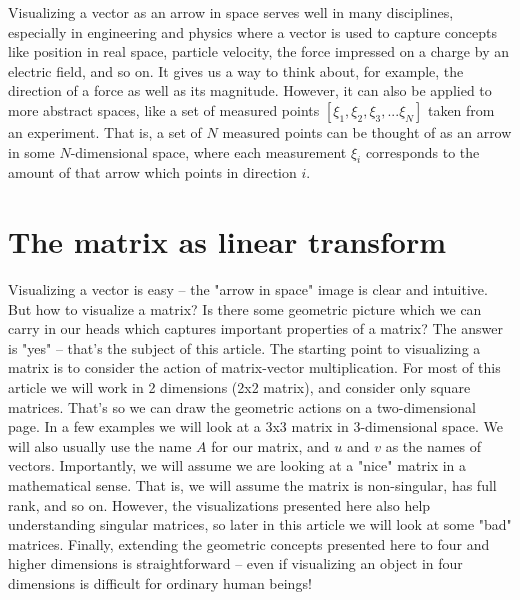 \documentclass[onefignum,onetabnum]{siamart190516}
\begin{document}
Visualizing a vector as an arrow in space  
serves well in many disciplines, especially 
in engineering and physics where a vector is used to capture concepts like 
position in real space, particle velocity, the force impressed on a charge by an electric 
field, and so on.  It gives us a way to think about, for example, the 
direction of a force as well as its magnitude.  However, it can also be applied
to more abstract spaces, like a set of measured points $[\xi_1, \xi_2, \xi_3, ... \xi_N] $ taken from an experiment.
That is, a set of $N$ measured points can be thought of as an arrow in some 
$N$-dimensional space, where each measurement $\xi_i$ corresponds to the
amount of that arrow which points in direction $i$.


\section{The matrix as linear transform}
\label{sec:linear_transform}
Visualizing a vector is easy -- the "arrow in space" image is clear
and intuitive.  But how to visualize a matrix?  Is there some geometric
picture which we can carry in our heads which captures important properties
of a matrix?  The answer is "yes" -- that's the subject of this article.
The starting point to visualizing a matrix is
to consider the action of matrix-vector multiplication.  For most of
this article we will work
in 2 dimensions (2x2 matrix), and consider only square matrices.  
That's so we can draw the geometric actions on a two-dimensional page.
In a few examples we will look
at a 3x3 matrix in 3-dimensional space. 
We will also usually use the name $A$ for our matrix, and $u$ and
$v$ as the names of vectors.
Importantly, we will
assume we are looking at a "nice" matrix in a mathematical sense.
That is, we will assume the matrix is
non-singular, has full rank, and so on.  However, the visualizations presented here
also help understanding singular matrices, so later in this article
we will look at some "bad" matrices.  
Finally, extending the geometric concepts
presented here to four and higher dimensions is straightforward -- even if
visualizing an object in four dimensions is difficult for
ordinary human beings!
 
\end{document}
